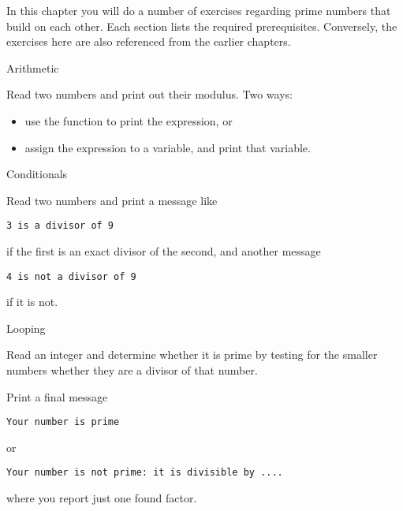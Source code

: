 
In this chapter you will do a number of exercises regarding prime
numbers that build on each other. Each section lists the required
prerequisites. Conversely, the exercises here are also referenced from
the earlier chapters.

 {Arithmetic}

\prerequisite{\ref{sec:expr}}

\begin{exercise}
  \label{ex:prime:modvar}
  Read two numbers and print out their modulus. Two ways:
  \begin{itemize}
  \item use the  function to print the expression, or
  \item assign the expression to a variable, and print that variable.
  \end{itemize}
\end{exercise}

 {Conditionals}

\prerequisite{\ref{sec:if}}

\begin{exercise}
  \label{ex:prime:divtest}
  Read two numbers and print a message like
\begin{lstlisting}
3 is a divisor of 9
\end{lstlisting}
  if the first is an exact
  divisor of the second, and another message
\begin{lstlisting}
4 is not a divisor of 9
\end{lstlisting}
if it is not.
\end{exercise}

 {Looping}

\prerequisite{\ref{sec:for}}

\begin{exercise}
  \label{ex:prime:test}
  Read an integer and determine whether it is prime by testing for the
  smaller numbers whether they are a
  divisor of that number. 

  Print a final message
\begin{lstlisting}
Your number is prime
\end{lstlisting}
or
\begin{lstlisting}
Your number is not prime: it is divisible by ....
\end{lstlisting}
where you report just one found factor.
\end{exercise}

